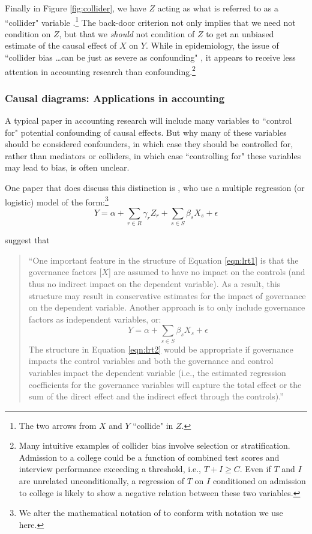 \documentclass[11pt,reqno,titlepage]{amsart}
\begin{document}
\begin{doublespace}
Finally in Figure \ref{fig:collider}, we have $Z$ acting as what is referred to as a ``collider" variable \citep{Glymour:2008aa,Pearl:2009kh}.\footnote{
The two arrows from $X$ and $Y$ ``collide" in $Z$.} 
The back-door criterion not only implies that we need not condition on $Z$, but that we \emph{should} not condition of $Z$ to get an unbiased estimate of the causal effect of $X$ on $Y$.
While in epidemiology, the issue of ``collider bias \dots can be just as severe as confounding" \citep[p.\,186]{Glymour:2008aa}, it appears to receive less attention in accounting research than confounding.\footnote{
Many intuitive examples of collider bias involve selection or stratification.
Admission to a college could be a function of combined test scores and interview performance exceeding a threshold, i.e., $T + I \geq C$. Even if $T$ and $I$ are unrelated unconditionally, a regression of $T$ on $I$ conditioned on admission to college is likely to show a negative relation between these two variables.}

\subsubsection{Causal diagrams: Applications in accounting}
A typical paper in accounting research will include many variables  to ``control for" potential confounding of causal effects.
But why many of these variables should be considered confounders, in which case they should be controlled for, rather than mediators or colliders, in which case ``controlling for" these variables may lead to bias, is often unclear.

One paper that does discuss this distinction is \citet{Larcker:2007aa}, who use a multiple regression (or logistic) model of the form:\footnote{We alter the mathematical notation of  \citet{Larcker:2007aa} to conform with notation we use here.}
\begin{equation}
Y = \alpha + \sum_{r \in R} \gamma _r Z_r + \sum_{s \in S} \beta_s X_s + \epsilon \label{eqn:lrt1}
\end{equation}

\citet{Larcker:2007aa} suggest that 
\begin{quote}
``One important feature in the structure of Equation \ref{eqn:lrt1} is that the governance factors [$X$] are assumed to have no impact on the controls (and thus no indirect impact on the dependent variable). 
As a result, this structure may result in conservative estimates for the impact of governance on the dependent variable. Another approach is to only include governance factors as independent variables, or:
\begin{equation}
Y = \alpha + \sum_{s \in S} \beta_s X_s + \epsilon \label{eqn:lrt2}
\end{equation}
The structure in Equation \ref{eqn:lrt2} would be appropriate if governance impacts the control variables and both the governance and control variables impact the dependent variable (i.e., the estimated regression coefficients for the governance variables will capture the total effect or the sum of the direct effect and the indirect effect through the controls).''
\end{quote}


\end{doublespace}
\end{document}
